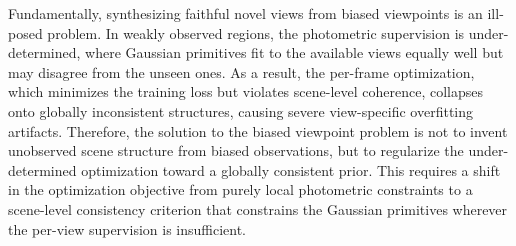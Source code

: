\documentclass[lettersize,journal]{IEEEtran}
\begin{document}

{\color{blue} 
Fundamentally, synthesizing faithful novel views from biased viewpoints is an ill-posed problem. 
In weakly observed regions, the photometric supervision is under-determined, where Gaussian primitives fit to the available views equally well but may disagree from the unseen ones. As a result, the per-frame optimization, which minimizes the training loss but violates scene-level coherence, collapses onto globally inconsistent structures, causing severe view-specific overfitting artifacts.
Therefore, the solution to the biased viewpoint problem is not to invent unobserved scene structure from biased observations, but to regularize the under-determined optimization toward a globally consistent prior.
This requires a shift in the optimization objective from purely local photometric constraints to a scene-level consistency criterion that constrains the Gaussian primitives wherever the per-view supervision is insufficient.
}
\end{document}

